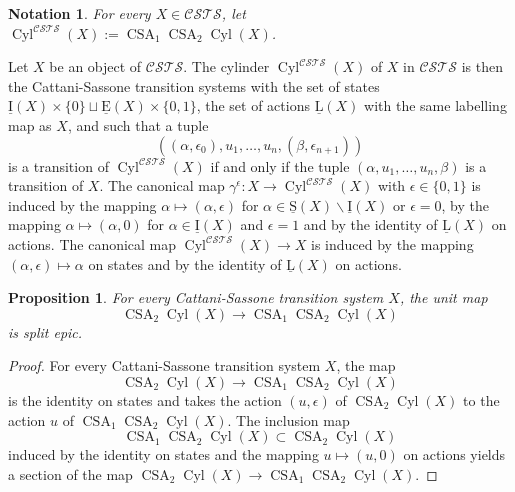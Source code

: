 \documentclass[a4paper,12pt]{amsart}
\newtheorem{prop}[thm]{Proposition}
\newtheorem{nota}[thm]{Notation}
\begin{document}
\begin{nota} For every $X\in {\mathcal{C\!S\!T\!S}}$, let $\operatorname{{Cyl}}^{\mathcal{C\!S\!T\!S}}(X):= \operatorname{CSA}_1
  \operatorname{CSA}_2\operatorname{{Cyl}}(X)$. \end{nota}

Let $X$ be an object of ${\mathcal{C\!S\!T\!S}}$. The cylinder $\operatorname{{Cyl}}^{\mathcal{C\!S\!T\!S}}(X)$ of $X$
in ${\mathcal{C\!S\!T\!S}}$ is then the Cattani-Sassone transition systems with the set
of states $\operatorname{\underline{I}}(X)\times\{0\} \sqcup \operatorname{\underline{E}}(X) \times \{0,1\}$, the set of
actions $\operatorname{\underline{L}}(X)$ with the same labelling map as $X$, and such that a
tuple \[((\alpha,\epsilon_0),u_1,\dots,u_n,(\beta,\epsilon_{n+1}))\]
is a transition of $\operatorname{{Cyl}}^{\mathcal{C\!S\!T\!S}}(X)$ if and only if the tuple
$(\alpha,u_1,\dots,u_n,\beta)$ is a transition of $X$.  The canonical
map $\gamma^\epsilon:X \to \operatorname{{Cyl}}^{\mathcal{C\!S\!T\!S}}(X)$ with $\epsilon \in \{0,1\}$
is induced by the mapping $\alpha \mapsto (\alpha,\epsilon)$ for
$\alpha \in \operatorname{\underline{S}}(X)\backslash \operatorname{\underline{I}}(X)$ or $\epsilon=0$, by the mapping
$\alpha \mapsto (\alpha,0)$ for $\alpha \in \operatorname{\underline{I}}(X)$ and $\epsilon=1$
and by the identity of $\operatorname{\underline{L}}(X)$ on actions. The canonical map
$\operatorname{{Cyl}}^{\mathcal{C\!S\!T\!S}}(X)\to X$ is induced by the mapping
$(\alpha,\epsilon)\mapsto \alpha$ on states and by the identity of
$\operatorname{\underline{L}}(X)$ on actions.

\begin{prop} \label{another-section} For every Cattani-Sassone
  transition system $X$, the unit map \[\operatorname{CSA}_2 \operatorname{{Cyl}}(X) \to \operatorname{CSA}_1
  \operatorname{CSA}_2\operatorname{{Cyl}}(X)\] is split epic.
\end{prop}

\begin{proof} For every Cattani-Sassone transition system $X$, the map \[\operatorname{CSA}_2
\operatorname{{Cyl}}(X) \to \operatorname{CSA}_1 \operatorname{CSA}_2\operatorname{{Cyl}}(X)\] is the identity on states and takes
the action $(u,\epsilon)$ of $\operatorname{CSA}_2 \operatorname{{Cyl}}(X)$ to the action $u$ of
$\operatorname{CSA}_1 \operatorname{CSA}_2\operatorname{{Cyl}}(X)$. The inclusion map \[\operatorname{CSA}_1 \operatorname{CSA}_2\operatorname{{Cyl}}(X)
\subset \operatorname{CSA}_2 \operatorname{{Cyl}}(X)\] induced by the identity on states and the
mapping $u\mapsto (u,0)$ on actions yields a section of the map
$\operatorname{CSA}_2 \operatorname{{Cyl}}(X) \to \operatorname{CSA}_1 \operatorname{CSA}_2\operatorname{{Cyl}}(X)$.  \end{proof}
\end{document}
